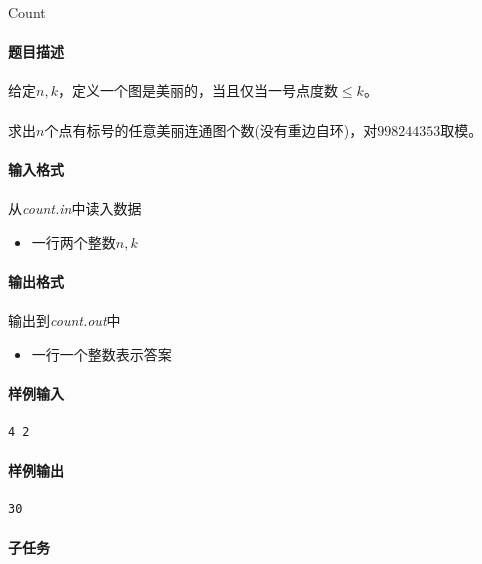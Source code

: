 \documentclass[UTF8]{ctexart}
\begin{document}
\clearpage
\begin{center}
	\large{Count}
\end{center}
\paragraph{题目描述}
\paragraph{}给定$n,k$，定义一个图是美丽的，当且仅当一号点度数$\leq k$。
\paragraph{}求出$n$个点有标号的任意美丽连通图个数(没有重边自环)，对$998244353$取模。
\paragraph{输入格式}
\paragraph{}从\emph{count.in}中读入数据
\begin{itemize}
\item 一行两个整数$n,k$
\end{itemize}
\paragraph{输出格式}
\paragraph{}输出到\emph{count.out}中
\begin{itemize}
	\item 一行一个整数表示答案
\end{itemize}
\paragraph{样例输入}
\begin{lstlisting}
4 2
\end{lstlisting}
\paragraph{样例输出}
\begin{lstlisting}
30
\end{lstlisting}
\paragraph{子任务}
\end{document}
